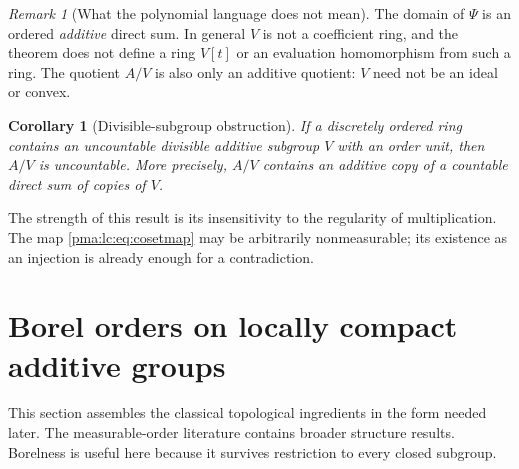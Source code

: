 \documentclass[11pt]{article}
\numberwithin{equation}{section}
\newtheorem{corollary}[corollary]{Corollary}
\theoremstyle{definition}
\theoremstyle{remark}
\newtheorem{remark}[remark]{Remark}
\begin{document}
\begin{remark}[What the polynomial language does not mean]
The domain of $\Psi$ is an ordered \emph{additive} direct sum. In general
$V$ is not a coefficient ring, and the theorem does not define a ring
$V[t]$ or an evaluation homomorphism from such a ring. The quotient $A/V$
is also only an additive quotient: $V$ need not be an ideal or convex.
\end{remark}

\begin{corollary}[Divisible-subgroup obstruction]\label{pma:lc:cor:divisible}
If a discretely ordered ring contains an uncountable divisible additive
subgroup $V$ with an order unit, then $A/V$ is uncountable. More precisely,
$A/V$ contains an additive copy of a countable direct sum of copies of $V$.
\end{corollary}

The strength of this result is its insensitivity to the regularity of
multiplication. The map \eqref{pma:lc:eq:cosetmap} may be arbitrarily nonmeasurable;
its existence as an injection is already enough for a contradiction.

\section{Borel orders on locally compact additive groups}
\label{pma:lc:sec:lca}

This section assembles the classical topological ingredients in the form
needed later. The measurable-order literature \cite{HewittKoshi,AsmarMS}
contains broader structure results. Borelness is useful here because it
survives restriction to every closed subgroup.
\end{document}
